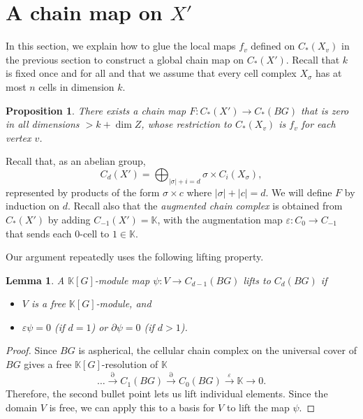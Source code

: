 \documentclass[11pt,letterpaper]{amsart}
\newtheorem{lemma}[theorem]{Lemma}
\newtheorem{proposition}[theorem]{Proposition}
\begin{document}
\section{A chain map on $X'$\label{chainmapF}}
In this section, we explain how to glue the local maps $f_v$ defined on $C_*(X_v)$ in the previous section to construct a global chain map on $C_*(X')$. Recall that $k$ is fixed once and for all and that we assume that every cell complex $X_{\sigma}$ has at most $n$ cells in dimension $k$. 

\begin{proposition}
\label{deform}
There exists a chain map $F:C_*(X')\rightarrow C_*(BG)$ that is zero in all dimensions $>k+\dim Z$, whose restriction to $C_*(X_v)$ is $f_v$ for each vertex $v$. 
\end{proposition}


Recall that, as an abelian group, 
$$
C_d(X')=\bigoplus_{|\sigma|+i=d}\sigma\times C_i(X_{\sigma}),
$$
represented by products of the form $\sigma\times c$ where $|\sigma|+|c|=d$. We will define $F$ by induction on $d$. Recall also that the {\it augmented chain complex} is obtained from $C_*(X')$ by adding $C_{-1}(X')=\mathbb K$, with the augmentation map $\varepsilon:C_0\rightarrow C_{-1}$ that sends each $0$-cell to $1\in\mathbb K$. 

Our argument repeatedly uses the following lifting property. 
\begin{lemma}
\label{lift}
A $\mathbb K[G]$-module map $\psi:V\rightarrow C_{d-1}(BG)$ lifts to $C_d(BG)$ if
\begin{itemize}
\item 
$V$ is a free $\mathbb K[G]$-module, and
\item 
$\varepsilon\psi=0$ (if $d=1$) or $\partial\psi=0$ (if $d>1$).
\end{itemize}
\end{lemma}
\begin{proof}
Since $BG$ is aspherical, the cellular chain complex on the universal cover of $BG$ gives a free $\mathbb K[G]$-resolution of $\mathbb K$
$$
\dots \stackrel{\partial}\rightarrow C_1(BG)\stackrel{\partial}\rightarrow C_0(BG)\stackrel{\varepsilon}\rightarrow \mathbb K\rightarrow 0.
$$
Therefore, the second bullet point lets us lift individual elements. Since the domain $V$ is free, we can apply this to a basis for $V$ to lift the map $\psi$.
\end{proof}
\end{document}
